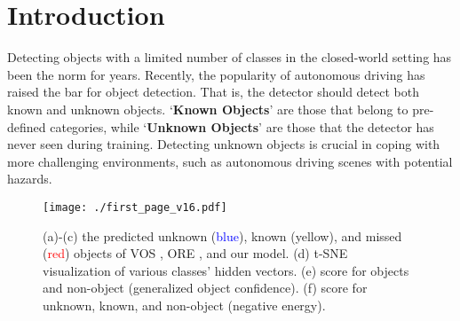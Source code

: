 \documentclass[10pt,twocolumn,letterpaper]{article}
\newcommand{\xf}[1]{{\color{black} #1}}
\newcommand{\xff}[1]{{\color{black} #1}}
\begin{document}
\section{Introduction}
\label{sec:intro}

Detecting objects with a limited number of classes in the closed-world setting \cite{ren2015faster,redmon2016you, liu2016ssd, he2017mask, lin2017feature, lin2017focal, redmon2017yolo9000, cai2018cascade, carion2020end, zhu2020deformable} has been the \xff{norm for} years.
Recently,
the popularity of autonomous driving \cite{pinggera2016lost, ramos2017detecting, dosovitskiy2017carla, 8126154, 9210191,8794279, janai2020computer, YuZhou-IJCV2016-SFVT, NIPS2012_3e313b9b, ZheLiu-AAAI2019-TANet, 2014ONLINE} has \xff{raised the bar} for object detection.
\xf{That is, the detector should \xff{detect} both known and unknown objects.
`\textbf{Known Objects}' are those that belong to pre-defined categories,
\xff{while `\textbf{Unknown Objects}'} are those that the detector has never seen during training.
Detecting unknown objects \xff{is crucial in coping} with more challenging environments,
such as autonomous driving scenes with potential hazards.}


\begin{figure}
\centering\texttt{[image: ./first\_page\_v16.pdf]}
\caption{
(a)-(c) the predicted unknown (\textcolor{blue}{blue}), known (\textcolor{yellow2}{yellow}), and missed (\textcolor{red}{red}) objects of VOS \cite{vos}, ORE \cite{owod}, and our model.
(d) t-SNE visualization of various classes' hidden vectors.
(e) score for objects and non-object (generalized object confidence).
(f) score for unknown, known, and non-object (negative energy).
}
\vspace{-10pt}
\label{fig:first_page}
\end{figure}
\end{document}
